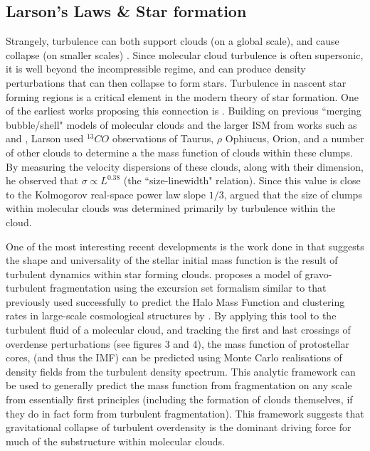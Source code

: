 \documentclass[12pt, preprint]{aastex}
\begin{document}
\subsection{Larson's Laws \& Star formation}
Strangely, turbulence can both support clouds (on a global scale), and cause
collapse (on smaller scales) \citep{mac2004}.  Since molecular cloud
turbulence is often supersonic, it is well beyond the incompressible regime,
and can produce density perturbations that can then collapse to form
stars\citep{elm2004}. Turbulence in nascent star forming 
regions is a critical element in the modern theory 
of star formation. One of the earliest works proposing this connection is
\citet{larson1981}.  Building on previous ``merging bubble/shell" models of
molecular clouds and the larger ISM from works such as \citet{norman1980} and
\citet{mckee1977}, Larson used $^{13}CO$ observations of Taurus, $\rho$
Ophiucus, Orion, and a number of other clouds to determine a the mass function
of clouds within these clumps.  By measuring the velocity dispersions of these
clouds, along with their dimension, he observed that $\sigma \propto L^{0.38}$
(the ``size-linewidth" relation).  Since this value is close to the Kolmogorov
real-space power law slope $1/3$, \citet{larson1981} argued that the size of
clumps within molecular clouds was determined primarily by turbulence within
the cloud.

One of the most interesting recent developments is the work done in 
\citet{hopk2013} that suggests the
shape and universality of the stellar initial mass function is the result of 
turbulent dynamics within
star forming clouds. \citet{hopk2013} proposes a model of gravo-turbulent
fragmentation using the excursion set formalism similar to that previously used 
successfully to predict the Halo Mass Function and clustering rates in
large-scale cosmological structures by \citet{press1974}.  By applying this tool
to the turbulent fluid of a molecular cloud, and tracking the first and last
crossings of overdense perturbations (see figures 3 and 4), the mass function of
protostellar cores, (and thus the IMF) can be predicted using Monte Carlo
realisations of density fields from the turbulent density spectrum.  This analytic framework
can be used to generally predict the mass function from fragmentation
on any scale from essentially first principles (including the formation 
of clouds themselves, if they do in fact
form from turbulent fragmentation).  This framework suggests that gravitational
collapse of turbulent overdensity is the dominant driving force for much of the
substructure within molecular clouds.
\end{document}
